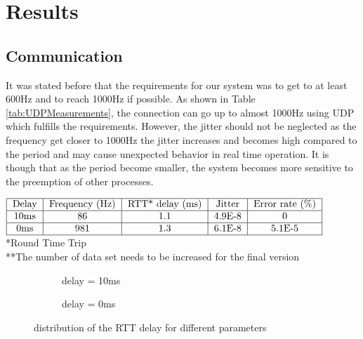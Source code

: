 \section{Results}

\subsection{Communication}

 It was stated before that the requirements for our system was to get to at least 600Hz and to reach 1000Hz if possible. As shown in Table \ref{tab:UDPMeasurements}, the connection can go up to almost 1000Hz using UDP which fulfills the requirements. However, the jitter should not be neglected as the frequency get closer to 1000Hz the jitter increases and becomes high compared to the period and may cause unexpected behavior in real time operation. It is though that as the period become smaller, the system becomes more sensitive to the preemption of other processes.
\begin{table}[h]
  $\begin{tabular}{|c|c|c|c|c|c|}
    \hline
    \text{Delay} & \text{Frequency (Hz)} & \text{RTT* delay (ms)} & \text{Jitter} & \text{Error rate (\%)}\\
    \hline
    10ms & 86 & 1.1 & 4.9E-8 & 0 \\
    \hline
    0ms & 981 & 1.3 & 6.1E-8 & 5.1E-5 \\
    \hline
  \end{tabular}$
  *Round Time Trip\\
  **The number of data set needs to be increased for the final version
  \caption{UDP**}
  \label{tab:UDPMeasurements}
\end{table}



\begin{figure}[h]
  \centering
  \begin{subfigure}{.45\linewidth}
    \centering
    
    \caption{delay = 10ms}
    \label{fig:10ms}
  \end{subfigure}
  \begin{subfigure}{.45\linewidth}
    \centering
    
    \caption{delay = 0ms}
    \label{fig:0ms}
  \end{subfigure}
\caption{distribution of the RTT delay for different parameters}
\label{fig:histograms}
\end{figure}





